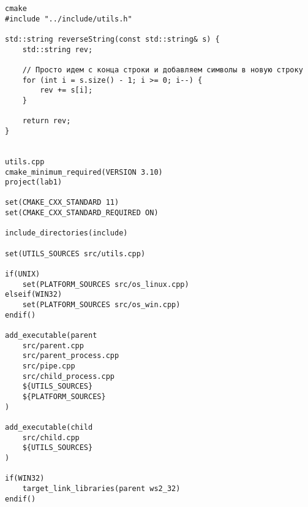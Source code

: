 \begin{verbatim}
cmake
#include "../include/utils.h"

std::string reverseString(const std::string& s) {
    std::string rev;
    
    // Просто идем с конца строки и добавляем символы в новую строку
    for (int i = s.size() - 1; i >= 0; i--) {
        rev += s[i];
    }
    
    return rev;
}


utils.cpp
cmake_minimum_required(VERSION 3.10)
project(lab1)

set(CMAKE_CXX_STANDARD 11)
set(CMAKE_CXX_STANDARD_REQUIRED ON)

include_directories(include)

set(UTILS_SOURCES src/utils.cpp)

if(UNIX)
    set(PLATFORM_SOURCES src/os_linux.cpp)
elseif(WIN32)
    set(PLATFORM_SOURCES src/os_win.cpp)
endif()

add_executable(parent
    src/parent.cpp
    src/parent_process.cpp
    src/pipe.cpp
    src/child_process.cpp
    ${UTILS_SOURCES}
    ${PLATFORM_SOURCES}
)

add_executable(child
    src/child.cpp
    ${UTILS_SOURCES}
)

if(WIN32)
    target_link_libraries(parent ws2_32)
endif()
\end{verbatim}


